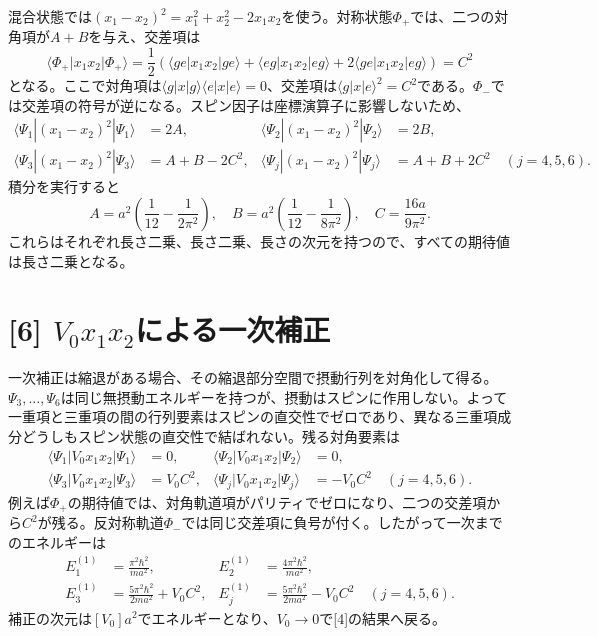 \documentclass[11pt,a4paper]{article}
\begin{document}
混合状態では$(x_1-x_2)^2=x_1^2+x_2^2-2x_1x_2$を使う。対称状態$\Phi_+$では、二つの対角項が$A+B$を与え、交差項は
\begin{equation}
 \langle\Phi_+|x_1x_2|\Phi_+\rangle
 =\frac12\left(\langle ge|x_1x_2|ge\rangle+\langle eg|x_1x_2|eg\rangle
 +2\langle ge|x_1x_2|eg\rangle\right)=C^2
\end{equation}
となる。ここで対角項は$\langle g|x|g\rangle\langle e|x|e\rangle=0$、交差項は$\langle g|x|e\rangle^2=C^2$である。$\Phi_-$では交差項の符号が逆になる。スピン因子は座標演算子に影響しないため、
\begin{align}
 \langle\Psi_1|(x_1-x_2)^2|\Psi_1\rangle&=2A,&
 \langle\Psi_2|(x_1-x_2)^2|\Psi_2\rangle&=2B,\\
 \langle\Psi_3|(x_1-x_2)^2|\Psi_3\rangle&=A+B-2C^2,&
 \langle\Psi_j|(x_1-x_2)^2|\Psi_j\rangle&=A+B+2C^2\quad(j=4,5,6).
\end{align}
積分を実行すると
\begin{equation}
 A=a^2\left(\frac1{12}-\frac1{2\pi^2}\right),\quad
 B=a^2\left(\frac1{12}-\frac1{8\pi^2}\right),\quad
 C=\frac{16a}{9\pi^2}.
\end{equation}
これらはそれぞれ長さ二乗、長さ二乗、長さの次元を持つので、すべての期待値は長さ二乗となる。

\section*{[6] $V_0x_1x_2$による一次補正}
一次補正は縮退がある場合、その縮退部分空間で摂動行列を対角化して得る。$\Psi_3,\ldots,\Psi_6$は同じ無摂動エネルギーを持つが、摂動はスピンに作用しない。よって一重項と三重項の間の行列要素はスピンの直交性でゼロであり、異なる三重項成分どうしもスピン状態の直交性で結ばれない。残る対角要素は
\begin{align}
 \langle\Psi_1|V_0x_1x_2|\Psi_1\rangle&=0,&
 \langle\Psi_2|V_0x_1x_2|\Psi_2\rangle&=0,\\
 \langle\Psi_3|V_0x_1x_2|\Psi_3\rangle&=V_0C^2,&
 \langle\Psi_j|V_0x_1x_2|\Psi_j\rangle&=-V_0C^2\quad(j=4,5,6).
\end{align}
例えば$\Phi_+$の期待値では、対角軌道項がパリティでゼロになり、二つの交差項から$C^2$が残る。反対称軌道$\Phi_-$では同じ交差項に負号が付く。したがって一次までのエネルギーは
\begin{align}
 E_1^{(1)}&=\frac{\pi^2\hbar^2}{ma^2},&
 E_2^{(1)}&=\frac{4\pi^2\hbar^2}{ma^2},\\
 E_3^{(1)}&=\frac{5\pi^2\hbar^2}{2ma^2}+V_0C^2,&
 E_j^{(1)}&=\frac{5\pi^2\hbar^2}{2ma^2}-V_0C^2\quad(j=4,5,6).
\end{align}
補正の次元は$[V_0]a^2$でエネルギーとなり、$V_0\to0$で[4]の結果へ戻る。
\end{document}
